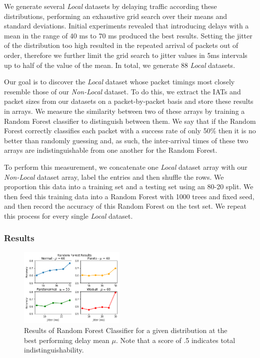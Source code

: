 \documentclass[sigconf]{acmart}
\begin{document}
We generate several \textit{Local} datasets by delaying traffic according these distributions, performing an exhaustive grid search over their means and standard deviations. Initial experiments revealed that introducing delays with a mean in the range of 40 ms to 70 ms produced the best results. Setting the jitter of the distribution too high resulted in the repeated arrival of packets out of order, therefore we further limit the grid search to jitter values in 5ms intervals up to half of the value of the mean. In total, we generate 88 \textit{Local} datasets.

Our goal is to discover the \textit{Local} dataset whose packet timings most closely resemble those of our \textit{Non-Local} dataset. To do this, we extract the IATs and packet sizes from our datasets on a packet-by-packet basis and store these results in arrays. We measure the similarity between two of these arrays by training a Random Forest classifier to distinguish between them. We say that if the Random Forest correctly classifies each packet with a success rate of only 50\% then it is no better than randomly guessing and, as such, the inter-arrival times of these two arrays are indistinguishable from one another for the Random Forest.

To perform this measurement, we concatenate one \textit{Local} dataset array with our \textit{Non-Local} dataset array, label the entries and then shuffle the rows. We proportion this data into a training set and a testing set using an 80-20 split. We then feed this training data into a Random Forest with 1000 trees and fixed seed, and then record the accuracy of this Random Forest on the test set. We repeat this process for every single \textit{Local} dataset.

\subsubsection*{Results}


\begin{figure}
\captionsetup{justification=centering}
\centering
\includegraphics[width=0.45\textwidth]{images/1-plot_exp1.png}
\caption{Results of Random Forest Classifier for a given distribution at the best performing delay mean $\mu$. Note that a score of .5 indicates total indistinguishability.}
\label{Fig:rf_graph}
\end{figure}
\end{document}

